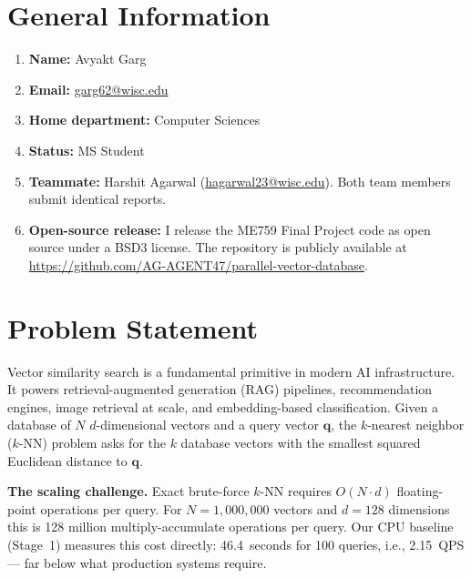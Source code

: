 \documentclass[12pt]{article}
\begin{document}
\tableofcontents
\newpage

\section{General Information}

\begin{enumerate}[leftmargin=2.2cm, label=\textbf{\arabic*.}]
  \item \textbf{Name:} Avyakt Garg
  \item \textbf{Email:} \href{mailto:garg62@wisc.edu}{garg62@wisc.edu}
  \item \textbf{Home department:} Computer Sciences
  \item \textbf{Status:} MS Student
  \item \textbf{Teammate:} Harshit Agarwal
        (\href{mailto:hagarwal23@wisc.edu}{hagarwal23@wisc.edu}).
        Both team members submit identical reports.
  \item \textbf{Open-source release:} I release the ME759 Final Project code as
        open source under a BSD3 license. The repository is publicly available at
        \href{https://github.com/AG-AGENT47/parallel-vector-database}%
        {https://github.com/AG-AGENT47/parallel-vector-database}.
\end{enumerate}

\section{Problem Statement}

Vector similarity search is a fundamental primitive in modern AI infrastructure.
It powers retrieval-augmented generation (RAG) pipelines, recommendation engines,
image retrieval at scale, and embedding-based classification.
Given a database of $N$ $d$-dimensional vectors and a query vector $\mathbf{q}$,
the $k$-nearest neighbor ($k$-NN) problem asks for the $k$ database vectors with
the smallest squared Euclidean distance to $\mathbf{q}$.

\textbf{The scaling challenge.}
Exact brute-force $k$-NN requires $O(N \cdot d)$ floating-point operations per query.
For $N{=}1{,}000{,}000$ vectors and $d{=}128$ dimensions this is 128 million
multiply-accumulate operations per query.
Our CPU baseline (Stage~1) measures this cost directly: 46.4~seconds for 100
queries, i.e., 2.15~QPS --- far below what production systems require.
\end{document}
